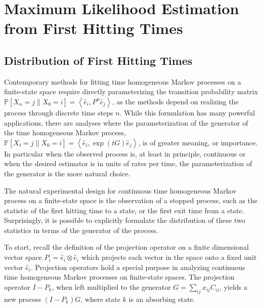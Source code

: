 \chapter{Maximum Likelihood Estimation from First Hitting Times}
\section{Distribution of First Hitting Times}
Contemporary methods for fitting time homogeneous Markov processes on a finite-state space
require directly parameterizing the transition probability matrix $\mathbb{P}\left[X_n = j \left\|X_0 = i \right.\right] = \left\langle \hat{e}_i, P^n \hat{e}_j \right\rangle$,
as the methods depend on realizing the process through discrete time steps $n$. While this 
formulation has many powerful applications, there are analyses where the parameterization of 
the generator of the time homogeneous Markov process, $\mathbb{P}\left[X_t = j \left\|X_0 = i \right.\right] = \left\langle \hat{e}_i, \exp\left({tG}\right) \hat{e}_j \right\rangle$, 
is of greater meaning, or importance. In particular when the observed process is, at least
in principle, continuous or when the desired estimator is in units of rates per time, the 
parameterization of the generator is the more natural choice.

The natural experimental design for continuous time homogeneous Markov process on a
finite-state space is the observation of a stopped process, such as the statistic of the 
first hitting time to a state, or the first exit time from a state. Surprisingly, it is 
possible to explicitly formulate the distribution of these two statistics in terms of the 
generator of the process.

To start, recall the definition of the projection operator on a finite dimensional vector
space $P_i = \hat{e}_i \otimes \hat{e}_i$ which projects each vector in the space onto a
fixed unit vector $\hat{e}_i$. Projection operators hold a special purpose in analyzing
continuous time homogeneous Markov processes on finite-state spaces. The projection operator
$I-P_k$, when left multiplied to the generator $G = \sum_{ij}x_{ij}C_{ij}$, yields a new 
process $\left(I-P_k\right)G$, where state $k$ is an absorbing state.

